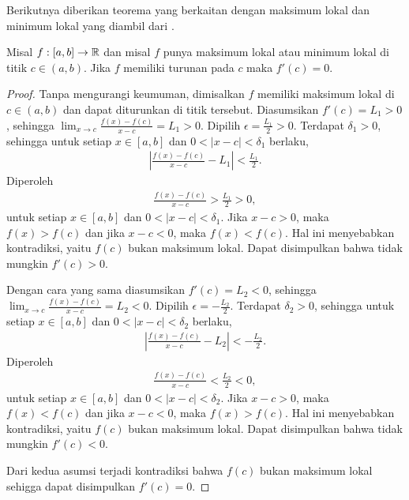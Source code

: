Berikutnya diberikan teorema yang berkaitan dengan maksimum lokal dan minimum lokal yang diambil dari \citep{thomas}.
\begin{teorema}\label{2.4.5}
    Misal $f:[a,b] \to \mathbb{R}$ dan misal $f$ punya maksimum lokal atau minimum lokal di titik $c \in (a,b)$. Jika $f$ memiliki turunan pada $c$ maka $f'(c)=0$.
\end{teorema}
\begin{proof}
    Tanpa mengurangi keumuman, dimisalkan $f$ memiliki maksimum lokal di $c\in(a,b)$ dan dapat diturunkan di titik tersebut. Diasumsikan $f'(c) = L_1 > 0$, sehingga $\lim_{x \to c} \frac{f(x) - f(c)}{x-c} = L_1 > 0$. Dipilih $\epsilon = \frac{L_1}{2} > 0$. Terdapat $\delta_1 > 0$, sehingga untuk setiap  $x \in [a,b]$ dan $0 < |x - c| < \delta_1$ berlaku,
    \begin{align*}
        \left|\frac{f(x) - f(c)}{x-c} - L_1\right| < \frac{L_1}{2}.
    \end{align*}
    Diperoleh
    \begin{align*}
        \frac{f(x) - f(c)}{x-c} > \frac{L_1}{2} > 0,
    \end{align*}
    untuk setiap $x \in [a,b]$ dan $0 < |x - c| < \delta_1$.
    Jika $x-c > 0$, maka $f(x) > f(c)$ dan jika $x-c < 0$, maka $f(x) < f(c)$. Hal ini menyebabkan kontradiksi, yaitu $f(c)$ bukan maksimum lokal. Dapat disimpulkan bahwa tidak mungkin $f'(c) > 0$.

    Dengan cara yang sama diasumsikan $f'(c) = L_2 < 0$, sehingga $\lim_{x \to c} \frac{f(x) - f(c)}{x-c} = L_2 < 0$. Dipilih $\epsilon = -\frac{L_2}{2}$. Terdapat $\delta_2 > 0$, sehingga untuk setiap $x \in [a,b]$ dan $0 < |x - c| < \delta_2$ berlaku,
    \begin{align*}
        \left|\frac{f(x) - f(c)}{x-c} - L_2\right| < -\frac{L_2}{2}.
    \end{align*}
    Diperoleh
    \begin{align*}
        \frac{f(x) - f(c)}{x-c} < \frac{L_2}{2} < 0,
    \end{align*}
    untuk setiap $x \in [a,b]$ dan $0 < |x - c| < \delta_2$.
    Jika $x-c > 0$, maka $f(x) < f(c)$ dan jika $x-c < 0$, maka $f(x) > f(c)$. Hal ini menyebabkan kontradiksi, yaitu $f(c)$ bukan maksimum lokal. Dapat disimpulkan bahwa tidak mungkin $f'(c) < 0$.
    
    Dari kedua asumsi terjadi kontradiksi bahwa $f(c)$ bukan maksimum lokal sehigga dapat disimpulkan $f'(c) = 0$.
\end{proof}


